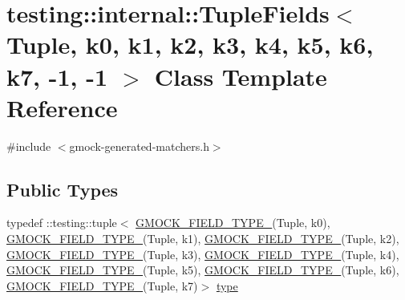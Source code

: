 \hypertarget{classtesting_1_1internal_1_1_tuple_fields_3_01_tuple_00_01k0_00_01k1_00_01k2_00_01k3_00_01k4_00_cda35487ca7d3bd5a9557919642ae14b}{}\section{testing\+::internal\+::Tuple\+Fields$<$ Tuple, k0, k1, k2, k3, k4, k5, k6, k7, -\/1, -\/1 $>$ Class Template Reference}
\label{classtesting_1_1internal_1_1_tuple_fields_3_01_tuple_00_01k0_00_01k1_00_01k2_00_01k3_00_01k4_00_cda35487ca7d3bd5a9557919642ae14b}


{\ttfamily \#include $<$gmock-\/generated-\/matchers.\+h$>$}

\subsection*{Public Types}
\begin{DoxyCompactItemize}
\item 
typedef \+::testing\+::tuple$<$ \mbox{\hyperlink{_obj__test_2lib_2googletest-release-1_88_81_2googlemock_2include_2gmock_2gmock-generated-matchers_8h_acf3e27de83a73f0d873da1cd471e505b}{G\+M\+O\+C\+K\+\_\+\+F\+I\+E\+L\+D\+\_\+\+T\+Y\+P\+E\+\_\+}}(Tuple, k0), \mbox{\hyperlink{_obj__test_2lib_2googletest-release-1_88_81_2googlemock_2include_2gmock_2gmock-generated-matchers_8h_acf3e27de83a73f0d873da1cd471e505b}{G\+M\+O\+C\+K\+\_\+\+F\+I\+E\+L\+D\+\_\+\+T\+Y\+P\+E\+\_\+}}(Tuple, k1), \mbox{\hyperlink{_obj__test_2lib_2googletest-release-1_88_81_2googlemock_2include_2gmock_2gmock-generated-matchers_8h_acf3e27de83a73f0d873da1cd471e505b}{G\+M\+O\+C\+K\+\_\+\+F\+I\+E\+L\+D\+\_\+\+T\+Y\+P\+E\+\_\+}}(Tuple, k2), \mbox{\hyperlink{_obj__test_2lib_2googletest-release-1_88_81_2googlemock_2include_2gmock_2gmock-generated-matchers_8h_acf3e27de83a73f0d873da1cd471e505b}{G\+M\+O\+C\+K\+\_\+\+F\+I\+E\+L\+D\+\_\+\+T\+Y\+P\+E\+\_\+}}(Tuple, k3), \mbox{\hyperlink{_obj__test_2lib_2googletest-release-1_88_81_2googlemock_2include_2gmock_2gmock-generated-matchers_8h_acf3e27de83a73f0d873da1cd471e505b}{G\+M\+O\+C\+K\+\_\+\+F\+I\+E\+L\+D\+\_\+\+T\+Y\+P\+E\+\_\+}}(Tuple, k4), \mbox{\hyperlink{_obj__test_2lib_2googletest-release-1_88_81_2googlemock_2include_2gmock_2gmock-generated-matchers_8h_acf3e27de83a73f0d873da1cd471e505b}{G\+M\+O\+C\+K\+\_\+\+F\+I\+E\+L\+D\+\_\+\+T\+Y\+P\+E\+\_\+}}(Tuple, k5), \mbox{\hyperlink{_obj__test_2lib_2googletest-release-1_88_81_2googlemock_2include_2gmock_2gmock-generated-matchers_8h_acf3e27de83a73f0d873da1cd471e505b}{G\+M\+O\+C\+K\+\_\+\+F\+I\+E\+L\+D\+\_\+\+T\+Y\+P\+E\+\_\+}}(Tuple, k6), \mbox{\hyperlink{_obj__test_2lib_2googletest-release-1_88_81_2googlemock_2include_2gmock_2gmock-generated-matchers_8h_acf3e27de83a73f0d873da1cd471e505b}{G\+M\+O\+C\+K\+\_\+\+F\+I\+E\+L\+D\+\_\+\+T\+Y\+P\+E\+\_\+}}(Tuple, k7)$>$ \mbox{\hyperlink{classtesting_1_1internal_1_1_tuple_fields_3_01_tuple_00_01k0_00_01k1_00_01k2_00_01k3_00_01k4_00_cda35487ca7d3bd5a9557919642ae14b_a4ca1e3e9805d5f38ac371529b67496d2}{type}}
\end{DoxyCompactItemize}
